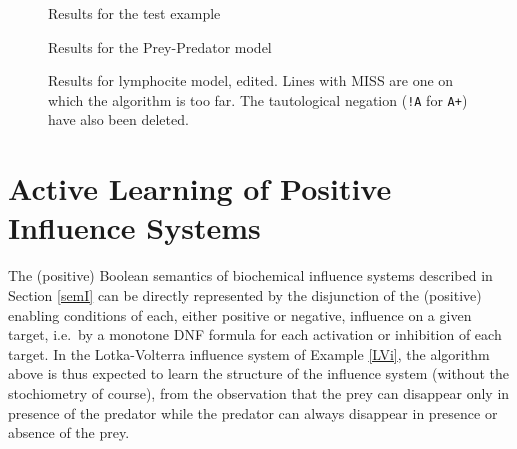 \documentclass{llncs}
\begin{document}
\begin{figure}
	
	\caption{Results for the test example \label{test_res}}
\end{figure}
\begin{figure}
	
	\caption{Results for the Prey-Predator model\label{preypred_res}}
\end{figure}
\begin{figure}
	
	\caption{Results for lymphocite model, edited. Lines with MISS are one on which the algorithm is too far. The tautological negation (\texttt{!A} for \texttt{A+}) have also been deleted.\label{lympho_res}}
\end{figure}


\section{Active Learning of Positive Influence Systems}

The (positive) Boolean semantics of biochemical influence systems described in Section \ref{semI}
can be directly represented by the disjunction of the (positive) enabling conditions of each, either positive or negative, influence on a given target,
i.e.~by a monotone DNF formula for each activation or inhibition of each target.
In the Lotka-Volterra influence system of Example \ref{LVi}, the algorithm above is thus expected to learn the structure of the influence system
(without the stochiometry of course),
from the observation that the prey can disappear only in presence of the predator
while the predator can always disappear in presence or absence of the prey.
\end{document}
